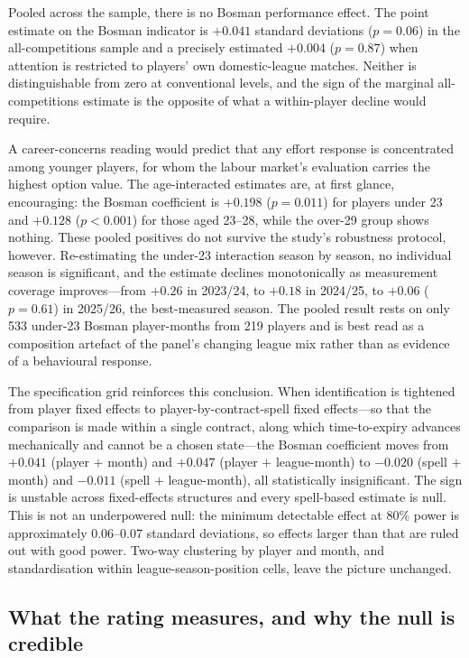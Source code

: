 Pooled across the sample, there is no Bosman performance effect. The point
estimate on the Bosman indicator is $+0.041$ standard deviations ($p = 0.06$) in
the all-competitions sample and a precisely estimated $+0.004$ ($p = 0.87$) when
attention is restricted to players' own domestic-league matches. Neither is
distinguishable from zero at conventional levels, and the sign of the marginal
all-competitions estimate is the opposite of what a within-player decline would
require.

A career-concerns reading would predict that any effort response is concentrated
among younger players, for whom the labour market's evaluation carries the
highest option value. The age-interacted estimates are, at first glance,
encouraging: the Bosman coefficient is $+0.198$ ($p = 0.011$) for players under
23 and $+0.128$ ($p < 0.001$) for those aged 23--28, while the over-29 group
shows nothing. These pooled positives do not survive the study's robustness
protocol, however. Re-estimating the under-23 interaction season by season, no
individual season is significant, and the estimate declines monotonically as
measurement coverage improves---from $+0.26$ in 2023/24, to $+0.18$ in 2024/25,
to $+0.06$ ($p = 0.61$) in 2025/26, the best-measured season. The pooled result
rests on only 533 under-23 Bosman player-months from 219 players and is best
read as a composition artefact of the panel's changing league mix rather than as
evidence of a behavioural response.

The specification grid reinforces this conclusion. When identification is
tightened from player fixed effects to player-by-contract-spell fixed
effects---so that the comparison is made within a single contract, along which
time-to-expiry advances mechanically and cannot be a chosen state---the Bosman
coefficient moves from $+0.041$ (player $+$ month) and $+0.047$ (player $+$
league-month) to $-0.020$ (spell $+$ month) and $-0.011$ (spell $+$
league-month), all statistically insignificant. The sign is unstable across
fixed-effects structures and every spell-based estimate is null. This is not an
underpowered null: the minimum detectable effect at 80\% power is approximately
0.06--0.07 standard deviations, so effects larger than that are ruled out with
good power. Two-way clustering by player and month, and standardisation within
league-season-position cells, leave the picture unchanged.

\subsection{What the rating measures, and why the null is credible}
\label{sec:results-anatomy}


